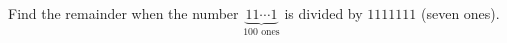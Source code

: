 Find the remainder when the number $\underbrace{11\cdots1}_{100\text{ ones}}$ is divided by $1111111$ (seven ones).
